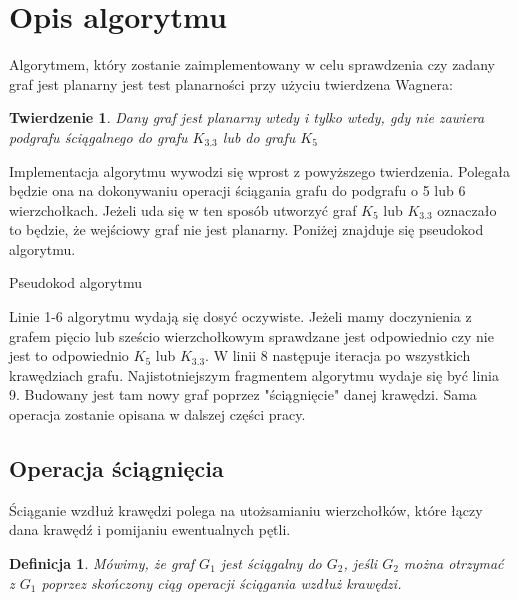 \documentclass[a4 122pt]{article}
\newtheorem{twierdzenie}{Twierdzenie}
\newtheorem{definicja}{Definicja}
\newenvironment{algorytm}[1][htb]
  {\renewcommand{\algorithmcfname}{Algorytm}%
   \begin{algorithm}[#1]%
  }{\end{algorithm}}
\begin{document}
	\section{Opis algorytmu}	
	Algorytmem, który zostanie zaimplementowany w celu sprawdzenia czy zadany graf jest planarny jest test planarności przy użyciu twierdzena Wagnera: 
	\begin{twierdzenie}
	Dany graf jest planarny wtedy i tylko wtedy, gdy nie zawiera podgrafu ściągalnego do grafu $K_{3.3}$ lub do grafu $ K_5 $
	\end{twierdzenie}
	Implementacja algorytmu wywodzi się wprost z powyższego twierdzenia. 
	Polegała będzie ona na dokonywaniu operacji ściągania grafu do podgrafu o 5 lub 6 wierzchołkach.
	Jeżeli uda się w ten sposób utworzyć graf $ K_5 $ lub $K_{3.3}$ oznaczało to będzie, że wejściowy graf nie jest planarny.
	Poniżej znajduje się pseudokod algorytmu.
	
	\begin{algorytm}[H]
	\newcommand{\forcond}{$i=0$ \KwTo $n$}
	\caption{Pseudokod algorytmu}
	\end{algorytm}
	
	Linie 1-6 algorytmu wydają się dosyć oczywiste. 
	Jeżeli mamy doczynienia z grafem pięcio lub sześcio wierzchołkowym sprawdzane jest odpowiednio czy nie jest to odpowiednio $K_5$ lub $K_{3.3}$. 
	W linii 8 następuje iteracja po wszystkich krawędziach grafu. 
	Najistotniejszym fragmentem algorytmu wydaje się być linia 9. 
	Budowany jest tam nowy graf poprzez "ściągnięcie" danej krawędzi. 
	Sama operacja zostanie opisana w dalszej części pracy.
	
	\subsection{Operacja ściągnięcia}
		Ściąganie wzdłuż krawędzi polega na utożsamianiu wierzchołków, które łączy dana krawędź i pomijaniu ewentualnych pętli. 
 		
		\begin{definicja}
			Mówimy, że graf $G_1$ jest ściągalny do $G_2$, jeśli $G_2$ można otrzymać z $G_1$ poprzez skończony ciąg operacji ściągania wzdłuż krawędzi.
		\end{definicja}
		
\end{document}
